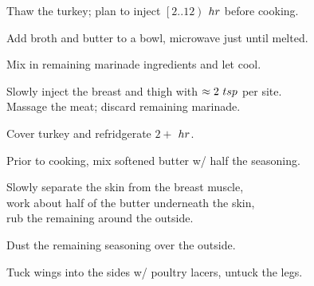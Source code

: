 \begin{preparation}
\item Thaw the turkey; plan to inject $\left[2..12\right)$ $\hour$ before cooking.
\item Add broth and butter to a bowl, microwave just until melted.
\item Mix in remaining marinade ingredients and let cool.
\item Slowly inject the breast and thigh with $\approx 2~\teaspoon$ per site.\\
    Massage the meat; discard remaining marinade.
\item Cover turkey and refridgerate $2\plus$ $\hour$.
\item Prior to cooking, mix softened butter w/ half the seasoning.
\item Slowly separate the skin from the breast muscle,\\
    work about half of the butter underneath the skin,\\
    rub the remaining around the outside.
\item Dust the remaining seasoning over the outside.
\item Tuck wings into the sides w/ poultry lacers, untuck the legs.
\end{preparation}

\recipeend%
